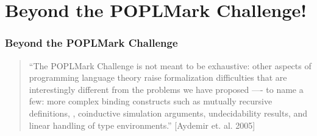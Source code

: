 \documentclass{beamer}
\begin{document}




  \section{Beyond the POPLMark Challenge!
}

\begin{frame}
  \frametitle{Beyond the POPLMark Challenge}

  \begin{quote}
``The
POPLMark
Challenge is not meant to be exhaustive: other aspects of programming language theory raise formalization difficulties that are interestingly
different from the problems we have proposed —- to name a few: more complex
binding constructs such as mutually recursive definitions,
{\color{orange}{logical relations proofs}}, coinductive simulation arguments, undecidability results, and linear handling of
type environments.'' [Aydemir et. al. 2005]
  \end{quote}


\end{frame}




\end{document}
